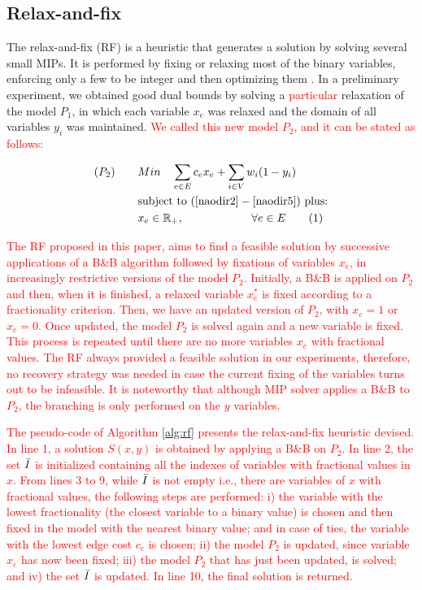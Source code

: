 \documentclass{ro}
\newcommand\numberthis{\addtocounter{equation}{1}\tag{\theequation}}
\begin{document}
\subsection{Relax-and-fix}

The relax-and-fix (RF) is a  heuristic  that  generates  a  solution  by  solving  several small MIPs. It is performed by fixing or relaxing most of the binary variables, enforcing only a few to be integer and then optimizing them \cite{toledo2015relax}. In a preliminary experiment, we obtained good dual bounds by solving a \textcolor{red}{particular} relaxation of the model $P_1$, in which each variable $x_e$  was relaxed and the domain of all  variables $y_i$ was maintained. \textcolor{red}{We called this new model $P_2$, and it can be stated as follows:}

\textcolor{red}{\begin{align*}
(P_2) \qquad	&Min \quad  \sum_{e \in E} c_e x_e + \sum_{i \in V} w_i (1 - y_i)  \\
&\text{subject to } (\ref{naodir2} - \ref{naodir5}) \text{ plus:}\\
	&x_e \in \mathbb{R_+}, \qquad \qquad \qquad \forall e \in E \label{xe-rl} \numberthis
\end{align*}
}

\textcolor{red}{
The RF proposed in this paper, aims to find a feasible solution by successive applications of a B\&B algorithm  followed by fixations  of variables $x_e$, in increasingly restrictive versions of the model $P_2$. Initially, a B\&B is applied on $P_2$ and then, when it is finished, a relaxed variable $x_e^*$ is fixed according to a fractionality criterion. Then, we have an updated version of $P_2$, with $x_e=1$ or $x_e=0$. Once updated, the model $P_2$ is solved again  and a new variable is fixed. This process is repeated until there are no more variables $x_e$ with fractional values. The RF always provided a feasible solution in our experiments, therefore, no recovery strategy was needed in case the current fixing of the variables turns out to be infeasible. It is noteworthy that although MIP solver applies a B\&B to $P_2$, the branching is only performed on the $y$ variables.}


\textcolor{red}{
The pseudo-code of Algorithm \ref{alg:rf} presents the relax-and-fix heuristic devised. In line 1, a solution $S(x, y)$ is obtained by applying a B\&B on $P_2$. In line 2, the set $\Bar{I}$ is initialized containing all the indexes of variables with fractional values in $x$. From lines 3 to 9, while $\Bar{I}$ is not empty i.e., there are variables of $x$ with fractional values, the following steps are performed: i) the variable with the lowest fractionality (the closest variable  to a binary value) is chosen and then fixed in the model with the nearest binary value; \textcolor{red}{and in case of ties, the variable with the lowest edge cost $c_e$ is chosen}; ii) the model $P_2$ is updated, since variable $x_e$ has now been fixed; iii) the model $P_2$ that has just been updated, is solved; and iv) the set $\Bar{I}$  is updated.  In line 10, the final solution is returned.}
\end{document}
